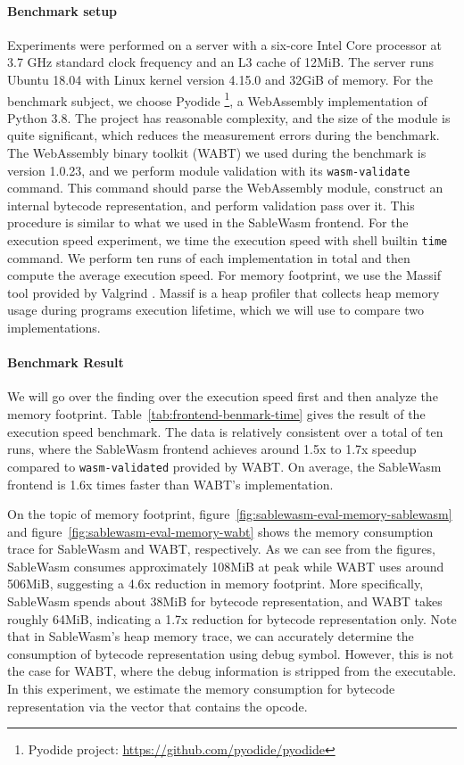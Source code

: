 \paragraph{Benchmark setup}
Experiments were performed on a server with a six-core Intel Core processor at 3.7 GHz standard clock frequency and an L3 cache of 12MiB. The server runs Ubuntu 18.04 with Linux kernel version 4.15.0 and 32GiB of memory. For the benchmark subject, we choose Pyodide \footnote{Pyodide project: \url{https://github.com/pyodide/pyodide}}, a WebAssembly implementation of Python 3.8. The project has reasonable complexity, and the size of the module is quite significant, which reduces the measurement errors during the benchmark. The WebAssembly binary toolkit (WABT) we used during the benchmark is version 1.0.23, and we perform module validation with its \texttt{wasm-validate} command. This command should parse the WebAssembly module, construct an internal bytecode representation, and perform validation pass over it. This procedure is similar to what we used in the SableWasm frontend. For the execution speed experiment, we time the execution speed with shell builtin \texttt{time} command. We perform ten runs of each implementation in total and then compute the average execution speed. For memory footprint, we use the Massif tool provided by Valgrind \cite{valgrind-paper}. Massif is a heap profiler that collects heap memory usage during programs execution lifetime, which we will use to compare two implementations.

\paragraph{Benchmark Result}
We will go over the finding over the execution speed first and then analyze the memory footprint. Table~\ref{tab:frontend-benmark-time} gives the result of the execution speed benchmark. The data is relatively consistent over a total of ten runs, where the SableWasm frontend achieves around 1.5x to 1.7x speedup compared to \texttt{wasm-validated} provided by WABT. On average, the SableWasm frontend is 1.6x times faster than WABT's implementation.



On the topic of memory footprint, figure~\ref{fig:sablewasm-eval-memory-sablewasm} and figure~\ref{fig:sablewasm-eval-memory-wabt} shows the memory consumption trace for SableWasm and WABT, respectively. As we can see from the figures, SableWasm consumes approximately 108MiB at peak while WABT uses around 506MiB, suggesting a 4.6x reduction in memory footprint. More specifically, SableWasm spends about 38MiB for bytecode representation, and WABT takes roughly 64MiB, indicating a 1.7x reduction for bytecode representation only. Note that in SableWasm's heap memory trace, we can accurately determine the consumption of bytecode representation using debug symbol. However, this is not the case for WABT, where the debug information is stripped from the executable. In this experiment, we estimate the memory consumption for bytecode representation via the vector that contains the opcode.

